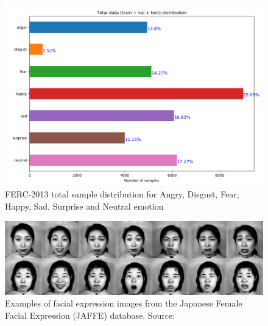 \documentclass[master]{thesis-uestc}
\begin{document}
\begin{figure}[ht]
\includegraphics[width=5in]{pic/total_data_distribution.png}
\caption{FERC-2013 total sample distribution for Angry, Disgust, Fear, Happy, Sad, Surprise and Neutral emotion}
\label{fer2013_distribution}
\end{figure}

\begin{figure}[ht]
\includegraphics[width=5in]{pic/jaffe.png}
\caption{Examples of facial expression images from the Japanese Female Facial Expression (JAFFE) database. Source: }
\label{jaffe_images}
\end{figure}
\end{document}
